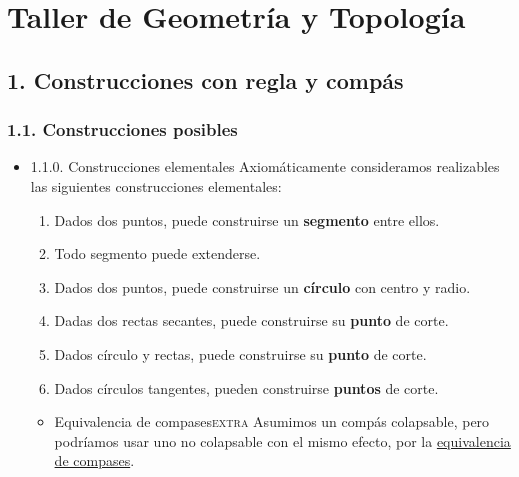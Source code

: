 \documentclass[11pt]{article}
\begin{document}
\section*{Taller de Geometría y Topología}
\label{sec-5}
\subsection*{1. Construcciones con regla y compás}
\label{sec-5-1}
\subsubsection*{1.1. Construcciones posibles}
\label{sec-5-1-1}
\begin{itemize}
\item 1.1.0. Construcciones elementales
\label{sec-5-1-1-1}
Axiomáticamente consideramos realizables las siguientes construcciones
elementales:

\begin{enumerate}
\item Dados dos puntos, puede construirse un \textbf{segmento} entre ellos.
\item Todo segmento puede extenderse.
\item Dados dos puntos, puede construirse un \textbf{círculo} con centro y radio.
\item Dadas dos rectas secantes, puede construirse su \textbf{punto} de corte.
\item Dados círculo y rectas, puede construirse su \textbf{punto} de corte.
\item Dados círculos tangentes, pueden construirse \textbf{puntos} de corte.
\end{enumerate}

\begin{itemize}
\item Equivalencia de compases\hfill{}\textsc{extra}
\label{sec-5-1-1-1-1}
Asumimos un compás colapsable, pero podríamos usar uno no colapsable
con el mismo efecto, por la \href{https://en.wikipedia.org/wiki/Compass_equivalence_theorem}{equivalencia de compases}.
\end{itemize}


\end{itemize}
\end{document}
